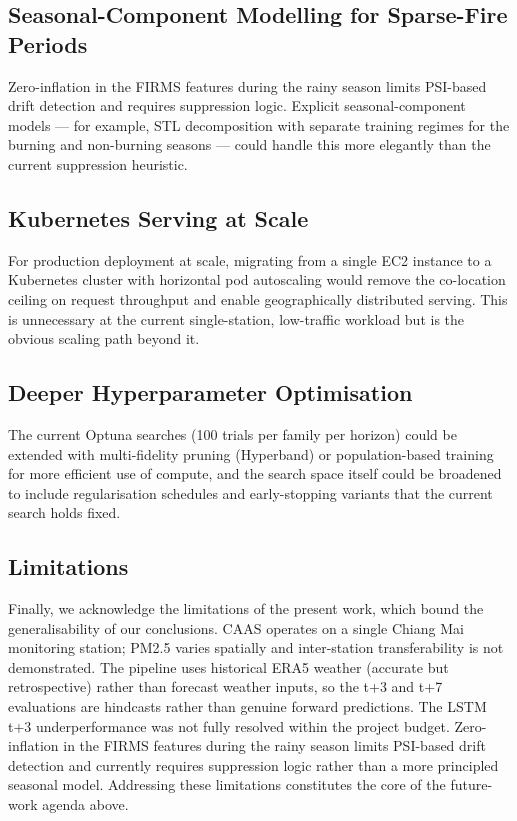\subsection{Seasonal-Component Modelling for Sparse-Fire Periods}

Zero-inflation in the FIRMS features during the rainy season limits
PSI-based drift detection and requires suppression logic.
Explicit seasonal-component models --- for example, STL decomposition
with separate training regimes for the burning and non-burning
seasons --- could handle this more elegantly than the current
suppression heuristic.

\subsection{Kubernetes Serving at Scale}

For production deployment at scale, migrating from a single EC2
instance to a Kubernetes cluster with horizontal pod autoscaling
would remove the co-location ceiling on request throughput and enable
geographically distributed serving. This is unnecessary at the current
single-station, low-traffic workload but is the obvious scaling path
beyond it.

\subsection{Deeper Hyperparameter Optimisation}

The current Optuna searches (100 trials per family per horizon) could
be extended with multi-fidelity pruning (Hyperband) or
population-based training for more efficient use of compute, and the
search space itself could be broadened to include regularisation
schedules and early-stopping variants that the current search holds
fixed.

\subsection{Limitations}

Finally, we acknowledge the limitations of the present work, which
bound the generalisability of our conclusions. CAAS operates on a
single Chiang Mai monitoring station; PM2.5 varies spatially and
inter-station transferability is not demonstrated. The pipeline uses
historical ERA5 weather (accurate but retrospective) rather than
forecast weather inputs, so the t+3 and t+7 evaluations are hindcasts
rather than genuine forward predictions. The LSTM t+3
underperformance was not fully resolved within the project budget.
Zero-inflation in the FIRMS features during the rainy season limits
PSI-based drift detection and currently requires suppression logic
rather than a more principled seasonal model. Addressing these
limitations constitutes the core of the future-work agenda above.
